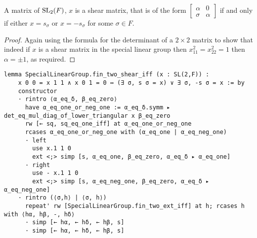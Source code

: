 \begin{corollary}
    \label{SpecialLinearGroup.fin_two_shear_iff}
    \leanok
    A matrix of $\operatorname{SL}_2(F)$, $x$ is a shear matrix, that is of the form $\begin{bmatrix}
        \alpha & 0\\
        \sigma & \alpha
    \end{bmatrix}$ if and only if either $x = s_\sigma$ or $x = - s_\sigma$ for some $\sigma \in F$.
\end{corollary}
\begin{proof}
\leanok
Again using the formula for the determinant of a $2 \times 2$ matrix to show that indeed if $x$ is a shear matrix in the special linear group then $x_{11}^2 = x_{22}^2 = 1$ then $\alpha = \pm 1$, as required.
\end{proof}
\begin{footnotesize}
\begin{verbatim}
lemma SpecialLinearGroup.fin_two_shear_iff (x : SL(2,F)) :
    x 0 0 = x 1 1 ∧ x 0 1 = 0 ↔ (∃ σ, s σ = x) ∨ ∃ σ, -s σ = x := by
    constructor
    · rintro ⟨α_eq_δ, β_eq_zero⟩
      have α_eq_one_or_neg_one := α_eq_δ.symm ▸ det_eq_mul_diag_of_lower_triangular x β_eq_zero
      rw [← sq, sq_eq_one_iff] at α_eq_one_or_neg_one
      rcases α_eq_one_or_neg_one with (α_eq_one | α_eq_neg_one)
      · left
        use x.1 1 0
        ext <;> simp [s, α_eq_one, β_eq_zero, α_eq_δ ▸ α_eq_one]
      · right
        use - x.1 1 0
        ext <;> simp [s, α_eq_neg_one, β_eq_zero, α_eq_δ ▸ α_eq_neg_one]
    · rintro (⟨σ,h⟩ | ⟨σ, h⟩)
      repeat' rw [SpecialLinearGroup.fin_two_ext_iff] at h; rcases h with ⟨hα, hβ, -, hδ⟩
      · simp [← hα, ← hδ, ← hβ, s]
      · simp [← hα, ← hδ, ← hβ, s]
\end{verbatim}
\end{footnotesize}

